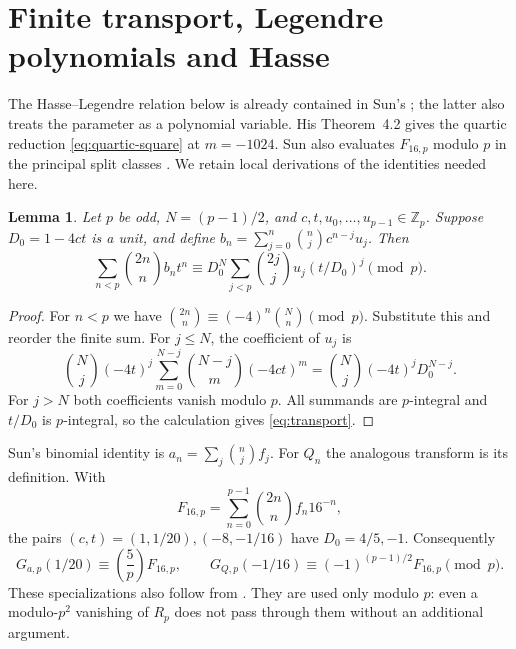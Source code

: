 \documentclass[11pt,a4paper]{article}
\newtheorem{lemma}[theorem]{Lemma}
\theoremstyle{remark}
\newcommand{\Zp}{\mathbb Z_p}
\newcommand{\leg}[2]{\left(\frac{#1}{#2}\right)}
\begin{document}
\section{Finite transport, Legendre polynomials and Hasse}\label{sec:modp}
The Hasse--Legendre relation below is already contained in Sun's
\cite[Theorem~2.1(ii) and equation~(4.1)]{sun-legendre-ii}; the latter
also treats the parameter as a polynomial variable. His Theorem~4.2
gives the quartic reduction \eqref{eq:quartic-square} at $m=-1024$.
Sun also evaluates $F_{16,p}$ modulo $p$ in the principal split classes
\cite[Theorem~2.10]{sun-franel}. We retain local derivations of the
identities needed here.

\begin{lemma}\label{lem:transport}
Let $p$ be odd, $N=(p-1)/2$, and
$c,t,u_0,\ldots,u_{p-1}\in\Zp$. Suppose $D_0=1-4ct$ is a unit,
and define $b_n=\sum_{j=0}^n\binom njc^{n-j}u_j$. Then
\begin{equation}\label{eq:transport}
 \sum_{n<p}\binom{2n}n b_nt^n
 \equiv D_0^N\sum_{j<p}\binom{2j}j u_j(t/D_0)^j\pmod p.
\end{equation}
\end{lemma}
\begin{proof}
For $n<p$ we have
$\binom{2n}n\equiv(-4)^n\binom Nn\pmod p$. Substitute this and
reorder the finite sum. For $j\le N$, the coefficient of $u_j$ is
\[
 \binom Nj(-4t)^j\sum_{m=0}^{N-j}\binom{N-j}m(-4ct)^m
   =\binom Nj(-4t)^jD_0^{N-j}.
\]
For $j>N$ both coefficients vanish modulo $p$. All summands are
$p$-integral and $t/D_0$ is $p$-integral, so the
calculation gives \eqref{eq:transport}.
\end{proof}

Sun's binomial identity \cite[Lemma~3.1]{sun} is
$a_n=\sum_j\binom nj f_j$. For $Q_n$ the analogous transform is
its definition. With
\[
 F_{16,p}=\sum_{n=0}^{p-1}\binom{2n}n f_n16^{-n},
\]
the pairs $(c,t)=(1,1/20),(-8,-1/16)$ have $D_0=4/5,-1$.
Consequently
\begin{equation}\label{eq:transport-values}
 G_{a,p}(1/20)\equiv\leg5p F_{16,p},\qquad
 G_{Q,p}(-1/16)\equiv(-1)^{(p-1)/2} F_{16,p}\pmod p.
\end{equation}
These specializations also follow from \cite[Theorem~3.4]{sun}.
They are used only modulo $p$: even a modulo-$p^2$ vanishing of
$R_p$ does not pass through them without an additional argument.
\end{document}
